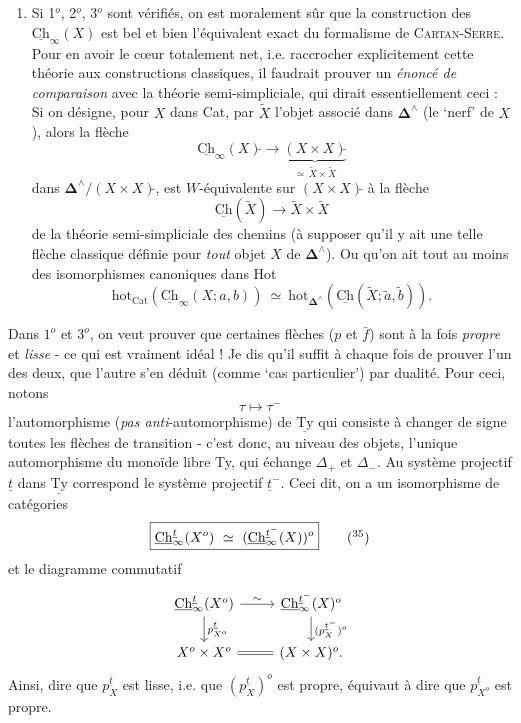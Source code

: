 \documentclass[11pt]{article}
\newcommand{\printedpage}[1]{\marginpar{\footnotesize p.~#1}}
\newcommand{\msp}[1]{\marginpar{\footnotesize [#1]}}
\newcommand{\Ch}{\underline{\mathrm{Ch}}}
\newcommand{\Ty}{\underline{\mathrm{Ty}}}
\newcommand{\uCh}{\underline{\mathrm{Ch}}}
\newcommand{\hot}{\mathrm{hot}}
\begin{document}
\begin{enumerate}[label={}, leftmargin=*]
Le cas qui nous occupe ici serait celui où $\mathbf{D}=\mathrm{HOT}$, où on prend $H^{\mathbf{D}}_\bullet$, et $a=$ objet final de $\mathbf{D}(e)=\mathrm{Hot}$.)

\item[5$^o$)] Si 1$^o$, 2$^o$, 3$^o$ sont vérifiés, on est moralement sûr que la construction des $\uCh_\infty(X)$ est bel et bien l'équivalent exact du formalisme de \textsc{Cartan-Serre}. Pour en avoir le c\oe ur totalement net, i.e. raccrocher explicitement cette théorie aux constructions classiques, il faudrait prouver un \textit{énoncé de comparaison} avec la théorie semi-simpliciale, qui dirait essentiellement ceci : Si on désigne, pour $X$ dans Cat, par $\tilde{X}$ l'objet associé dans $\mathbf{\Delta}^\wedge$ (le `nerf' de $X$), alors la flèche
\[
\uCh_\infty(X)\tilde{}\longrightarrow\underbrace{(X\times X)\tilde{}}_{\simeq\,\tilde{X}\times\tilde{X}}
\]
dans $\mathbf{\Delta}^\wedge/(X\times X)\tilde{}$, est $W$-équivalente sur $(X\times X)\tilde{}$ à la flèche
\[
\uCh(\tilde{X})\longrightarrow\tilde{X}\times\tilde{X}
\]
de la théorie semi-simpliciale des chemins (à supposer qu'il y ait une telle flèche classique définie pour \textit{tout} objet $X$ de $\mathbf{\Delta}^\wedge$). Ou qu'on ait tout au moins des isomorphismes canoniques dans Hot
\[
\hot_{\mathrm{Cat}}(\uCh_\infty(X;a,b))\ \simeq\ \hot_{\mathbf{\Delta}^\wedge}(\uCh(\tilde{X};\tilde{a},\tilde{b})).
\]
\end{enumerate}

\printedpage{89}

\msp{page 143}
Dans $1^o$ et $3^o$, on veut prouver que certaines flèches ($p$ et $\bar{f}$) sont à la fois \textit{propre} et \textit{lisse} - ce qui est vraiment idéal ! Je dis qu'il suffit à chaque fois de prouver l'un des deux, que l'autre s'en déduit (comme `cas particulier') par dualité. Pour ceci, notons
\[
\tau \longmapsto \tau^{-}
\]
l'automorphisme (\textit{pas anti}-automorphisme) de $\Ty$ qui consiste à changer de signe toutes les flèches de transition - c'est donc, au niveau des objets, l'unique automorphisme du monoïde libre Ty, qui échange $\Delta_+$ et $\Delta_-$. Au système projectif $\underline{t}$ dans $\Ty$ correspond le système projectif $\underline{t}^-$. Ceci dit, on a un isomorphisme de catégories
\[
\boxed{\Ch^{\underline{t}}_{\infty}(X^o) \ \simeq\ (\Ch^{\underline{t}^-}_{\infty}(X))^o} \tag*{$(^{35})$} %
\]
et le diagramme commutatif
\[
\begin{tikzcd}
\Ch^{\underline{t}}_{\infty}(X^o) \arrow[r, "\sim"] \arrow[d, "p^{\underline{t}}_{X^o}"] & \Ch^{\underline{t}^-}_{\infty}(X)^o \arrow[d, "(p^{\underline{t}^-}_{X})^o"] \\
X^o \times X^o \arrow[r, equal] & (X \times X)^o.
\end{tikzcd}
\]
Ainsi, dire que $p^{\underline{t}}_{X}$ est lisse, i.e. que $(p^{\underline{t}}_{X})^o$ est propre, équivaut à dire que $p^{\underline{t}}_{X^o}$ est propre.
\end{document}
